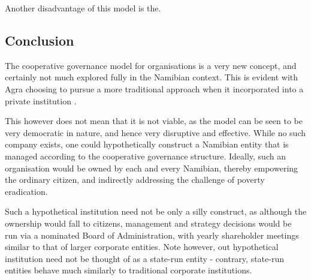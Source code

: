 \documentclass[]{article}
\begin{document}
Another disadvantage of this model is the.

\subsection{Conclusion}\label{conclusion}

The cooperative governance model for organisations is a very new
concept, and certainly not much explored fully in the Namibian context.
This is evident with Agra choosing to pursue a more traditional approach
when it incorporated into a private institution \citep{agra}.

This however does not mean that it is not viable, as the model can be
seen to be very democratic in nature, and hence very disruptive and
effective. While no such company exists, one could hypothetically
construct a Namibian entity that is managed according to the cooperative
governance structure. Ideally, such an organisation would be owned by
each and every Namibian, thereby empowering the ordinary citizen, and
indirectly addressing the challenge of poverty eradication.

Such a hypothetical institution need not be only a silly construct, as
although the ownership would fall to citizens, management and strategy
decisions would be run via a nominated Board of Administration, with
yearly shareholder meetings similar to that of larger corporate
entities. Note however, out hypothetical institution need not be thought
of as a state-run entity - contrary, state-run entities behave much
similarly to traditional corporate institutions.
\end{document}

